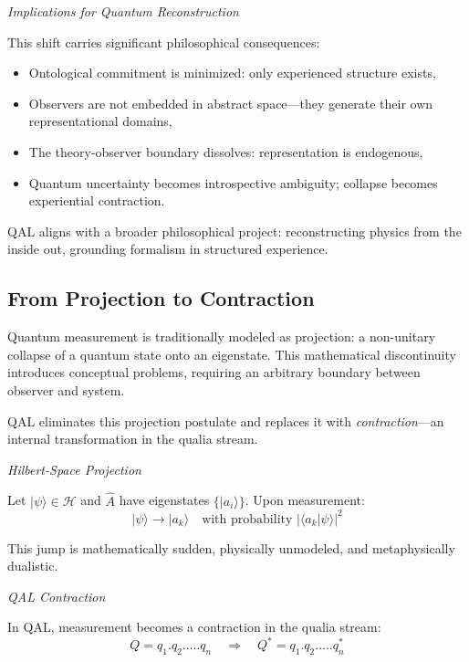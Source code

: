 \documentclass[11pt]{article}
\numberwithin{equation}{section} %
\begin{document}
\bigskip

\textit{Implications for Quantum Reconstruction}

This shift carries significant philosophical consequences:
\begin{itemize}
  \item Ontological commitment is minimized: only experienced structure exists,
  \item Observers are not embedded in abstract space---they generate their own representational domains,
  \item The theory-observer boundary dissolves: representation is endogenous,
  \item Quantum uncertainty becomes introspective ambiguity; collapse becomes experiential contraction.
\end{itemize}

QAL aligns with a broader philosophical project: reconstructing physics from the inside out, grounding formalism in structured experience.

\subsection{From Projection to Contraction}

Quantum measurement is traditionally modeled as projection: a non-unitary collapse of a quantum state onto an eigenstate. This mathematical discontinuity introduces conceptual problems, requiring an arbitrary boundary between observer and system.

QAL eliminates this projection postulate and replaces it with \textit{contraction}---an internal transformation in the qualia stream.

\bigskip

\textit{Hilbert-Space Projection}

Let \( |\psi\rangle \in \mathcal{H} \) and \( \hat{A} \) have eigenstates \( \{|a_i\rangle\} \). Upon measurement:
\begin{equation}
|\psi\rangle \rightarrow |a_k\rangle \quad \text{with probability } |\langle a_k | \psi \rangle|^2
\end{equation}

This jump is mathematically sudden, physically unmodeled, and metaphysically dualistic.

\bigskip

\textit{QAL Contraction}

In QAL, measurement becomes a contraction in the qualia stream:
\begin{equation}
Q = q_1 . q_2 . \dots . q_n \quad \Rightarrow \quad Q^* = q_1 . q_2 . \dots . q_n^*
\end{equation}
\end{document}
